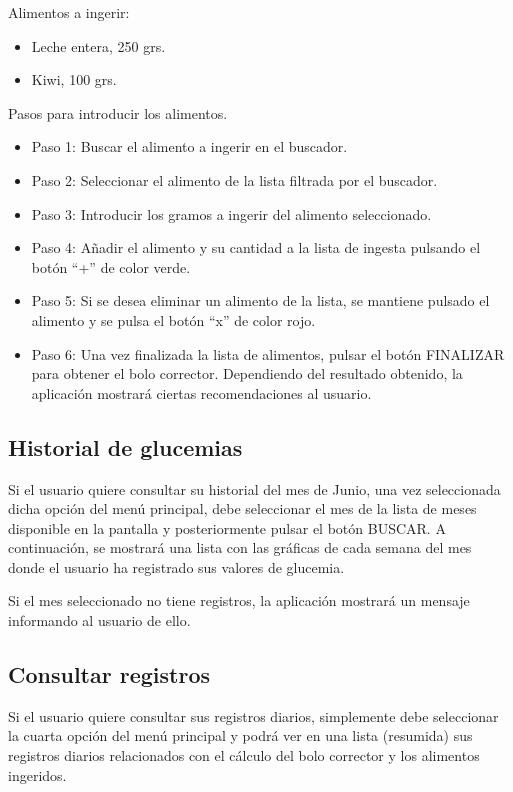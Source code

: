 Alimentos a ingerir:
\begin{itemize}
	\item Leche entera, 250 grs.
	\item Kiwi, 100 grs.
\end{itemize}

Pasos para introducir los alimentos.
\begin{itemize}
	\item Paso 1: Buscar el alimento a ingerir en el buscador.
	\item Paso 2: Seleccionar el alimento de la lista filtrada por el buscador.
	\item Paso 3: Introducir los gramos a ingerir del alimento seleccionado.
	\item Paso 4: Añadir el alimento y su cantidad a la lista de ingesta pulsando el botón ``+'' de color verde.
	\item Paso 5: Si se desea eliminar un alimento de la lista, se mantiene pulsado el alimento y se pulsa el botón ``x'' de color rojo.
	\item Paso 6: Una vez finalizada la lista de alimentos, pulsar el botón FINALIZAR para obtener el bolo corrector. Dependiendo del resultado obtenido, la aplicación mostrará ciertas recomendaciones al usuario.
\end{itemize}

\subsection{Historial de glucemias}\label{ssec:historialglu}
Si el usuario quiere consultar su historial del mes de Junio, una vez seleccionada dicha opción del menú principal, debe seleccionar el mes de la lista de meses disponible en la pantalla y posteriormente pulsar el botón BUSCAR. A continuación, se mostrará una lista con las gráficas de cada semana del mes donde el usuario ha registrado sus valores de glucemia.

Si el mes seleccionado no tiene registros, la aplicación mostrará un mensaje informando al usuario de ello.
\subsection{Consultar registros}\label{ssec:consultarregistros}
Si el usuario quiere consultar sus registros diarios, simplemente debe seleccionar la cuarta opción del menú principal y podrá ver en una lista (resumida) sus registros diarios relacionados con el cálculo del bolo corrector y los alimentos ingeridos.


